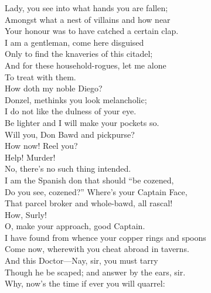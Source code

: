 \documentclass[a4paper,oneside,12pt]{memoir}
\begin{document}
\begin{drama*}
\surlyspeaks Lady, you see into what hands you are fallen;\\
Amongst what a nest of villains and how near\\
Your honour was to have catched a certain clap.\\
I am a gentleman, come here disguised\\
Only to find the knaveries of this citadel;\\
And for these household-rogues, let me alone\\
To treat with them.\\
\subtlespeaks {} How doth my noble Diego?\\
Donzel, methinks you look melancholic;\\
I do not like the dulness of your eye.\\
Be lighter and I will make your pockets so.\\
\surlyspeaks Will you, Don Bawd and pickpurse?\\
 How now! Reel you?\\
\subtlespeaks Help! Murder!\\
\surlyspeaks {} No, there's no such thing intended.\\
I am the Spanish don that should ``be cozened,\\
Do you see, cozened?'' Where's your Captain Face,\\
That parcel broker and whole-bawd, all rascal!\\
\facespeaks How, Surly!\\
\surlyspeaks {} O, make your approach, good Captain.\\
I have found from whence your copper rings and spoons\\
Come now, wherewith you cheat abroad in taverns.\\
And this Doctor---Nay, sir, you must tarry\\
Though he be scaped; and answer by the ears, sir.\\
\facespeaks Why, now's the time if ever you will quarrel:\\

\end{drama*}
\end{document}
